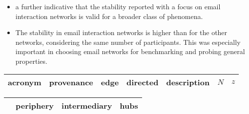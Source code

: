 \begin{itemize}
	\item a further indicative that the stability reported with a focus on email interaction networks is valid for a broader class of phenomena.
	\item The stability in email interaction networks is higher than for the other networks, considering the same number of participants. This was especially important in choosing email networks for benchmarking and probing general properties.
\end{itemize}

\begin{table*}[!h]
	\caption{Selected networks from three social platforms: Facebook, Twitter and Participabr.
	Both friendship and interaction networks were observed, yielding undirected and directed networks, respectively.
The number of agents $N$ and the number of edges $z$ are given on the last columns.
The acronyms, one for each network, are used throughout Tables~\ref{tab:secE},~\ref{tab:pcaE1I},~\ref{tab:pcaE1F},~\ref{tab:pcaE2} and~\ref{tab:pcaE3}. Data was collected in 2013 and 2014 within the anthropological physics framework~\cite{anPhy}.}
\begin{center}
\begin{tabular}{| l || c | c | c | c | c | c | }\hline
	acronym & provenance & edge & directed & description & $N$ & $z$ \\ \hline
	
\hline
\end{tabular}
\end{center}
\label{tab:E}
\end{table*}


\begin{table*}[!h]
	\caption{
	Percentage of agents in each Erd\"os sector in the friendship and interaction networks of Table~\ref{tab:E}. The ratios found in email networks are preserved. I1 and I4 are outliers, probably because they should be better characterized as a superposition of networks, rather than one coherent network. The degree was used for establishing the sectors.
	}
\begin{center}
\begin{tabular}{| l || c | c | c |}\hline
	 & periphery & intermediary & hubs \\ \hline
	
\hline
\end{tabular}
\end{center}
\label{tab:secE}
\end{table*}



